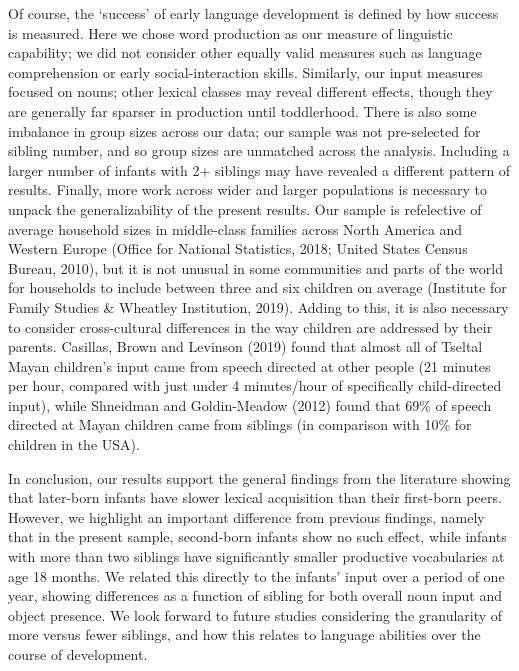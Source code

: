 \documentclass[
  english,
  man,floatsintext]{apa6}
\begin{document}
Of course, the `success' of early language development is defined by how success is measured. Here we chose word production as our measure of linguistic capability; we did not consider other equally valid measures such as language comprehension or early social-interaction skills. Similarly, our input measures focused on nouns; other lexical classes may reveal different effects, though they are generally far sparser in production until toddlerhood. There is also some imbalance in group sizes across our data; our sample was not pre-selected for sibling number, and so group sizes are unmatched across the analysis. Including a larger number of infants with 2+ siblings may have revealed a different pattern of results. Finally, more work across wider and larger populations is necessary to unpack the generalizability of the present results. Our sample is refelective of average household sizes in middle-class families across North America and Western Europe (Office for National Statistics, 2018; United States Census Bureau, 2010), but it is not unusual in some communities and parts of the world for households to include between three and six children on average (Institute for Family Studies \& Wheatley Institution, 2019). Adding to this, it is also necessary to consider cross-cultural differences in the way children are addressed by their parents. Casillas, Brown and Levinson (2019) found that almost all of Tseltal Mayan children's input came from speech directed at other people (21 minutes per hour, compared with just under 4 minutes/hour of specifically child-directed input), while Shneidman and Goldin-Meadow (2012) found that 69\% of speech directed at Mayan children came from siblings (in comparison with 10\% for children in the USA).

In conclusion, our results support the general findings from the literature showing that later-born infants have slower lexical acquisition than their first-born peers. However, we highlight an important difference from previous findings, namely that in the present sample, second-born infants show no such effect, while infants with more than two siblings have significantly smaller productive vocabularies at age 18 months. We related this directly to the infants' input over a period of one year, showing differences as a function of sibling for both overall noun input and object presence. We look forward to future studies considering the granularity of more versus fewer siblings, and how this relates to language abilities over the course of development.
\end{document}
